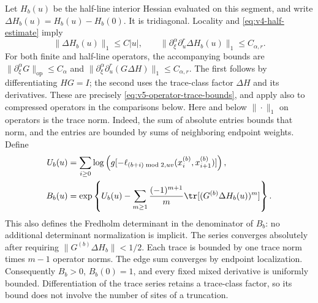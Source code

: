 Let $H_b(u)$ be the half-line interior Hessian evaluated on this
segment, and write $\Delta H_b(u)=H_b(u)-H_b(0)$. It is tridiagonal.
Locality and \eqref{eq:v4-half-estimate} imply
\begin{equation}\label{eq:v4-half-trace}
 \|\Delta H_b(u)\|_1\le C|u|,
 \qquad
 \|\partial_\xi^\alpha\partial_u^r\Delta H_b(u)\|_1
                      \le C_{\alpha,r}.
\end{equation}
For both finite and half-line operators, the accompanying bounds are
$\|\partial_\xi^\alpha G\|_{\mathrm{op}}\le C_\alpha$ and
$\|\partial_\xi^\alpha\partial_u^r(G\Delta H)\|_1\le C_{\alpha,r}$.
The first follows by differentiating $HG=I$; the second uses the
trace-class factor $\Delta H$ and its derivatives. These are precisely
\eqref{eq:v5-operator-trace-bounds}, and apply also to compressed
operators in the comparisons below.
Here and below $\|\cdot\|_1$ on operators is the trace norm. Indeed,
the sum of absolute entries bounds that norm, and the entries are
bounded by sums of neighboring endpoint weights. Define
\begin{align}
 U_b(u)&=\sum_{i\ge0}\log\left(
 g[-\ell_{(b+i)\bmod2,uv}(x_i^{(b)},x_{i+1}^{(b)})]\right),
 \label{eq:v4-half-product}\\
 B_b(u)&=\exp\left\{U_b(u)
 -\sum_{m\ge1}\frac{(-1)^{m+1}}m
       \tr[(G^{(b)}\Delta H_b(u))^m]\right\}.
 \label{eq:v4-half-amplitude}
\end{align}
This also defines the Fredholm determinant in the denominator of
$B_b$: no additional determinant normalization is implicit. The series
converges absolutely after requiring
$\|G^{(b)}\Delta H_b\|<1/2$. Each trace is bounded by one trace
norm times $m-1$ operator norms. The edge sum converges by endpoint
localization. Consequently $B_b>0$, $B_b(0)=1$, and every fixed
mixed derivative is uniformly bounded. Differentiation of the trace
series retains a trace-class factor, so its bound does not involve the
number of sites of a truncation.

